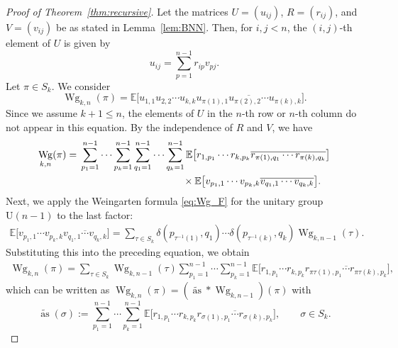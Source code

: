 \documentclass[10pt,a4paper]{amsart}
\numberwithin{equation}{section}
\theoremstyle{definition}
\newcommand{\UU}{\mathrm{U}}
\DeclareMathOperator{\Raise}{as}
\DeclareMathOperator{\Wg}{Wg}
\begin{document}
\begin{proof}[Proof of Theorem~\ref{thm:recursive}]
 Let the matrices $U=(u_{ij})$, $R=(r_{ij})$, and $V=(v_{ij})$ be as stated in Lemma~\ref{lem:BNN}.
 Then, for $i,j <n$, the $(i,j)$-th element of $U$ is given by
 \[
 u_{ij} = \sum_{p=1}^{n-1} r_{ip} v_{p j}.
 \]
 Let $\pi \in S_k$. We consider
 \[
 \Wg_{k,n}(\pi) = \mathbb{E}\bigl[ u_{1,1} u_{2,2} \cdots u_{k,k}
 \overline{u_{\pi(1),1} u_{\pi(2),2} \cdots u_{\pi(k),k}}\bigr].
 \]
 Since we assume $k+1 \le n$, the elements of $U$ in the $n$-th row or $n$-th column do not appear in this equation.
 By the independence of $R$ and $V$, we have
 \begin{align*}
 \Wg_{k,n}(\pi)
={}& \sum_{p_1=1}^{n-1} \cdots \sum_{p_k=1}^{n-1} \sum_{q_1=1}^{n-1} \cdots \sum_{q_k=1}^{n-1}
 \mathbb{E}\bigl[ r_{1, p_1} \cdots r_{k, p_k} \overline{r_{\pi(1),q_1} \cdots r_{\pi(k), q_k}}\bigr] \\
 & \hphantom{\sum_{p_1=1}^{n-1} \cdots \sum_{p_k=1}^{n-1} \sum_{q_1=1}^{n-1} \cdots \sum_{q_k=1}^{n-1}}{}
 \times \mathbb{E} \bigl[ v_{p_1, 1} \cdots v_{p_k, k} \overline{ v_{q_1, 1} \cdots v_{q_k, k} } \bigr].
 \end{align*}
 Next, we apply the Weingarten formula \eqref{eq:Wg_F} for the unitary group $\UU(n-1)$ to the last factor:
 \begin{align*}
 \mathbb{E} \bigl[ v_{p_1, 1} \cdots v_{p_k, k} \overline{ v_{q_1, 1} \cdots v_{q_k, k} } \bigr]
 = \sum_{\tau \in S_k} \delta(p_{\tau^{-1}(1)},q_1) \cdots \delta(p_{\tau^{-1}(k)},q_k) \Wg_{k,n-1}(\tau).
 \end{align*}
 Substituting this into the preceding equation, we obtain
 \begin{align*}
 \Wg_{k,n}(\pi)
 = \sum_{\tau \in S_k} \Wg_{k,n-1}(\tau) \sum_{p_1=1}^{n-1} \cdots \sum_{p_k=1}^{n-1}
 \mathbb{E} \bigl[ r_{1,p_1} \cdots r_{k,p_k}
 \overline{r_{\pi\tau(1),p_1} \cdots r_{\pi\tau(k),p_k}} \bigr],
 \end{align*}
which can be written as $\Wg_{k,n} (\pi)= (\widetilde{\Raise} * \Wg_{k,n-1})(\pi)$ with
\[
\widetilde{\Raise}(\sigma) := \sum_{p_1=1}^{n-1} \cdots \sum_{p_k=1}^{n-1}
\mathbb{E} \bigl[ r_{1,p_1} \cdots r_{k,p_k}
\overline{r_{\sigma(1),p_1} \cdots r_{\sigma(k),p_{k}}}\bigr], \qquad \sigma \in S_k.
\]


\end{proof}
\end{document}
